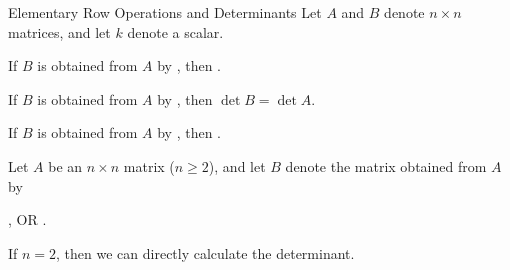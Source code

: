 \documentclass[xcolor=dvipsnames,aspectratio=169,t]{beamer}
\begin{document}
\begin{frame}{Elementary Row Operations and Determinants}
  \bbox
  Let $A$ and $B$ denote $n \times n$ matrices, and let $k$ denote a scalar. 
  \bi
    \item If $B$ is obtained from $A$ by , then .
    \item If $B$ is obtained from $A$ by , then \alert{$\det B = \det A$}.
    \item If $B$ is obtained from $A$ by , then .
  \ei
  \ebox
  
  \pause
  {\large {}}

    Let $A$ be an $n \times n$ matrix ($n\ge 2$), and let $B$ denote the matrix obtained from $A$ by
    \vspace*{-.7em}
    \begin{center}
      , OR .
    \end{center}
    
    \pause
    If $n=2$, then we can directly calculate the determinant.
    \medskip
    
    \begin{columns}
      
    \end{columns}
\end{frame}
\end{document}
